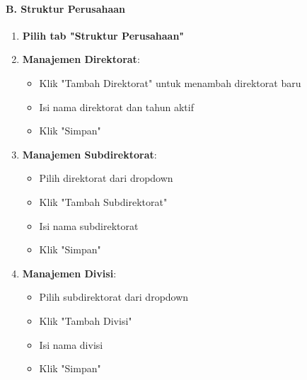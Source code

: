 \documentclass[12pt,a4paper]{article}
\begin{document}
\paragraph{B. Struktur Perusahaan}
\begin{enumerate}
    \item \textbf{Pilih tab "Struktur Perusahaan"}
    \item \textbf{Manajemen Direktorat}:
    \begin{itemize}
        \item Klik "Tambah Direktorat" untuk menambah direktorat baru
        \item Isi nama direktorat dan tahun aktif
        \item Klik "Simpan"
    \end{itemize}
    \item \textbf{Manajemen Subdirektorat}:
    \begin{itemize}
        \item Pilih direktorat dari dropdown
        \item Klik "Tambah Subdirektorat"
        \item Isi nama subdirektorat
        \item Klik "Simpan"
    \end{itemize}
    \item \textbf{Manajemen Divisi}:
    \begin{itemize}
        \item Pilih subdirektorat dari dropdown
        \item Klik "Tambah Divisi"
        \item Isi nama divisi
        \item Klik "Simpan"
    \end{itemize}
\end{enumerate}
\end{document}
